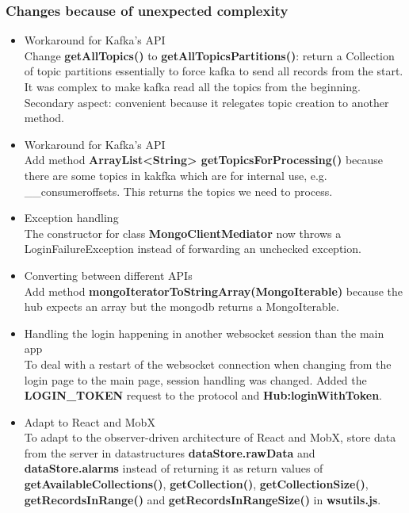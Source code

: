 \documentclass[oneside, english, final]{design}
\begin{document}
\subsubsection{Changes because of unexpected complexity}
\begin{itemize}
  \item{Workaround for Kafka's API}
    \\
    Change \textsf{\textbf{getAllTopics()}} to \textsf{\textbf{getAllTopicsPartitions()}}:
    return a Collection of topic partitions essentially to force kafka to send all records from the start.
    It was complex to make kafka read all the topics from the beginning.
    Secondary aspect: convenient because it relegates topic creation to another method.

  \item{Workaround for Kafka's API}
    \\
    Add method \textsf{\textbf{ArrayList<String> getTopicsForProcessing()}}
  because there are some topics in kakfka which are for internal use, e.g. \_\_consumeroffsets.
 This returns the topics we need to process.
	
  \item{Exception handling}
    \\ 
    The constructor for class \textsf{\textbf{MongoClientMediator}} now throws a LoginFailureException instead of forwarding an unchecked exception.

  \item{Converting between different APIs}
    \\ 
    Add method \textsf{\textbf{mongoIteratorToStringArray(MongoIterable)}}
    because the hub expects an array but the mongodb returns a MongoIterable.

  \item{Handling the login happening in another websocket session than the main app}
    \\
    To deal with a restart of the websocket connection when changing from the login page to the main page, session handling was changed. Added the \textsf{\textbf{LOGIN\_TOKEN}} request to the protocol and \textsf{\textbf{Hub:loginWithToken}}.

  \item{Adapt to React and MobX}
    \\
    To adapt to the observer-driven architecture of React and MobX, store data from the server in datastructures \textsf{\textbf{dataStore.rawData}} and \textsf{\textbf{dataStore.alarms}}
    instead of returning it as return values of
    \textsf{\textbf{getAvailableCollections()}},
    \textsf{\textbf{getCollection()}}, \textsf{\textbf{getCollectionSize()}}, \textsf{\textbf{getRecordsInRange()}} and \textsf{\textbf{getRecordsInRangeSize()}} in \textsf{\textbf{wsutils.js}}.

\end{itemize}
\end{document}
